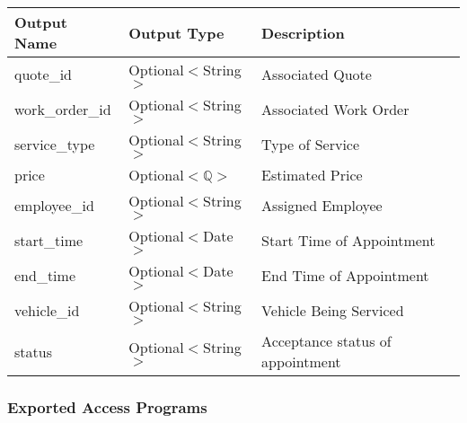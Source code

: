 \documentclass[12pt, titlepage]{article}
\begin{document}
\begin{table}[H]
	\begin{tabular}{|l|l|l|}
		\hline
		\textbf{Output Name} & \textbf{Output Type}   & \textbf{Description}             \\
		\hline
		quote\_id            & Optional$<$String$>$   & Associated Quote                 \\
		\hline
		work\_order\_id      & Optional$<$String$>$   & Associated Work Order            \\
		\hline
		service\_type        & Optional$<$String$>$   & Type of Service                  \\
		\hline
		price                & Optional$<\mathbb{Q}>$ & Estimated Price                  \\
		\hline
		employee\_id         & Optional$<$String$>$   & Assigned Employee                \\
		\hline
		start\_time          & Optional$<$Date$>$     & Start Time of Appointment        \\
		\hline
		end\_time            & Optional$<$Date$>$     & End Time of Appointment          \\
		\hline
		vehicle\_id          & Optional$<$String$>$   & Vehicle Being Serviced           \\
		\hline
		status               & Optional$<$String$>$   & Acceptance status of appointment \\
		\hline
	\end{tabular}
\end{table}

\subsubsection{Exported Access Programs}
\end{document}
